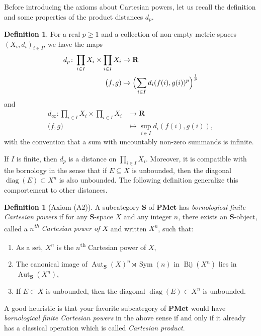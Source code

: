 \documentclass[a4paper]{article}
\newcounter{mycomment}
\newcommand{\mycomment}[2][]{\refstepcounter{mycomment}{\todo[color={green!33},size=\small]{\textbf{Commentaire [\uppercase{#1}\themycomment]:}~#2}}}
\newcommand{\GS}[1]{\mycomment[GS]{#1}}
\theoremstyle{definition}
\newtheorem{defn}[lem]{Definition}
\DeclareMathOperator\Sym{Sym}
\DeclareMathOperator\diag{diag}
\DeclareMathOperator\Aut{Aut}
\DeclareMathOperator\Bij{Bij}
\newcommand*{\field}[1]{\mathbf{#1}}
\newcommand*{\category}[1]{\textbf{#1}}
\newcommand*{\PMet}{\category{PMet}}
\newcommand*{\CatS}{\category{S}}
\newcommand*{\R}{\field{R}}
\begin{document}
Before introducing the axioms about Cartesian powers, let us recall the definition and some properties of the product distances $d_p$.
%
%
\begin{defn}
For a real $p\geq 1$ and a collection of non-empty metric spaces $(X_i,d_i)_{i\in I}$, we have the maps
\begin{align*}
d_p\colon \prod_{i\in I}X_i\times \prod_{i\in I}X_i&\to \R\\
\bigl(f,g)&\mapsto\Bigl(\sum_{i\in I}d_i(f(i),g(i))^p\Bigr)^{\frac1p}
\end{align*}
and
\begin{align*}
d_\infty\colon \prod_{i\in I}X_i\times \prod_{i\in I}X_i&\to \R\\
\bigl(f,g)&\mapsto\sup_{i\in I}d_i(f(i),g(i)),
\end{align*}
with the convention that a sum with uncountably non-zero summands is infinite.
\end{defn}
%
%
If $I$ is finite, then $d_p$ is a distance on $\prod_{i\in I}X_i$. Moreover, it is compatible with the bornology in the sense that if $E\subseteq X$ is unbounded, then the diagonal $\diag(E)\subset X^n$ is also unbounded.
The following definition generalize this comportement to other distances.
%
%
\begin{defn}[Axiom (A2)]\label{Def:Cartesian}
A subcategory \CatS{} of \PMet{} has \emph{bornological finite Cartesian powers} if for any \CatS-space $X$ and any integer $n$, there exists an \CatS-object, called a \emph{$n$\textsuperscript{th} Cartesian power of $X$} and written $X^n$, such that:
\begin{enumerate}
\item
As a set, $X^n$ is the $n$\textsuperscript{th} Cartesian power of $X$,
\item\label{Item:Product}
The canonical image of $\Aut_{\CatS}(X)^n\rtimes \Sym(n)$ in $\Bij(X^n)$ lies in $\Aut_{\CatS}(X^n)$,
\item\label{Condidef:2}
If $E\subset X$ is unbounded, then the diagonal $\diag(E)\subset X^n$ is unbounded.
\end{enumerate}
\end{defn}
%
%
A good heuristic is that your favorite subcategory of \PMet{} would have \emph{bornological finite Cartesian powers} in the above sense if and only if it already has a classical operation which is called \emph{Cartesian product}.
\end{document}

